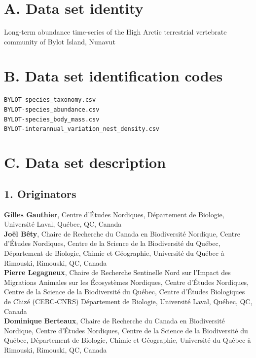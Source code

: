 \documentclass[a4paper,twoside,12pt]{article}
\begin{document}
    \section*{A. Data set identity} Long-term abundance time-series of the High Arctic terrestrial vertebrate community of Bylot Island, Nunavut
    \section*{B. Data set identification codes}
     \texttt{BYLOT-species\_taxonomy.csv}\\
     \texttt{BYLOT-species\_abundance.csv}\\
     \texttt{BYLOT-species\_body\_mass.csv}\\
     \texttt{BYLOT-interannual\_variation\_nest\_density.csv}\\
     
    \section*{C. Data set description}
                \subsection*{1. Originators}
                \textbf{Gilles Gauthier}, Centre d’Études Nordiques, Département de Biologie, Université Laval, Québec, QC, Canada\\
                \textbf{Joël Bêty},  Chaire de Recherche du Canada en Biodiversité Nordique, Centre d’Études Nordiques, Centre de la Science de la Biodiversité du Québec, Département de Biologie, Chimie et Géographie, Université du Québec à Rimouski, Rimouski, QC, Canada \\
                \textbf{Pierre Legagneux}, Chaire de Recherche Sentinelle Nord sur l’Impact des Migrations Animales sur les Écosystèmes Nordiques, Centre d’Études Nordiques, Centre de la Science de la Biodiversité du Québec, Centre d’Études Biologiques de Chizé (CEBC-CNRS) Département de Biologie, Université Laval, Québec, QC, Canada\\
                \textbf{Dominique Berteaux},  Chaire de Recherche du Canada en Biodiversité Nordique, Centre d’Études Nordiques, Centre de la Science de la Biodiversité du Québec, Département de Biologie, Chimie et Géographie, Université du Québec à Rimouski, Rimouski, QC, Canada \\
                
\end{document}
